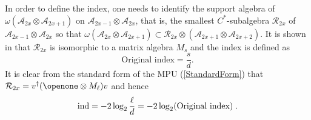 \documentclass[pra,twocolumn,nofootinbib,superscriptaddress]{revtex4-1}
\def\Id{{\openone}}
\begin{document}
In order to define the index, one needs to identify the support algebra of
$\omega(\mathcal{A}_{2x}\otimes \mathcal{A}_{2x+1})$ on
$\mathcal{A}_{2x-1}\otimes \mathcal{A}_{2x}$, that is, the smallest
$C^*$-subalgebra $\mathcal{R}_{2x}$ of $\mathcal{A}_{2x-1}\otimes
	\mathcal{A}_{2x}$ so that $\omega(\mathcal{A}_{2x}\otimes
	\mathcal{A}_{2x+1})\subset \mathcal{R}_{2x}\otimes
	\left(\mathcal{A}_{2x+1}\otimes \mathcal{A}_{2x+2}\right).$ It is shown in
\cite{gross:index-theorem} that $\mathcal{R}_{2x}$ is isomorphic to a matrix algebra $M_{s}$ and the index is defined as
\begin{equation}\label{eq:original-index}
	\text{Original index} = \frac{s}{d}.
\end{equation}
It is clear from the standard form of the MPU (\ref{StandardForm}) that $\mathcal R_{2x}= v^{\dagger}( \Id\otimes M_\ell )v$ and hence
$${\rm ind}= -2\log_2\frac{\ell}{d}=-2\log_2(\text{Original index})\; .$$








\end{document}
